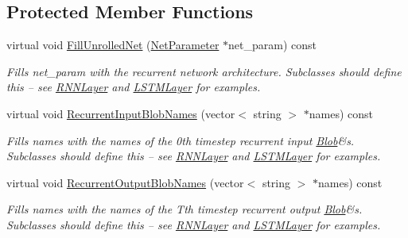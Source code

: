 \subsection*{Protected Member Functions}
\begin{DoxyCompactItemize}
\item 
\mbox{\label{classcaffe_1_1_l_s_t_m_layer_a66285fd55798aa17b8d5d0b7f30f8346}} 
virtual void \mbox{\hyperlink{classcaffe_1_1_l_s_t_m_layer_a66285fd55798aa17b8d5d0b7f30f8346}{Fill\+Unrolled\+Net}} (\mbox{\hyperlink{classcaffe_1_1_net_parameter}{Net\+Parameter}} $\ast$net\+\_\+param) const
\begin{DoxyCompactList}\small\item\em Fills net\+\_\+param with the recurrent network architecture. Subclasses should define this -- see \mbox{\hyperlink{classcaffe_1_1_r_n_n_layer}{R\+N\+N\+Layer}} and \mbox{\hyperlink{classcaffe_1_1_l_s_t_m_layer}{L\+S\+T\+M\+Layer}} for examples. \end{DoxyCompactList}\item 
\mbox{\label{classcaffe_1_1_l_s_t_m_layer_a03c6f191bd5a314981514b9bbd3ce450}} 
virtual void \mbox{\hyperlink{classcaffe_1_1_l_s_t_m_layer_a03c6f191bd5a314981514b9bbd3ce450}{Recurrent\+Input\+Blob\+Names}} (vector$<$ string $>$ $\ast$names) const
\begin{DoxyCompactList}\small\item\em Fills names with the names of the 0th timestep recurrent input \mbox{\hyperlink{classcaffe_1_1_blob}{Blob}}\&s. Subclasses should define this -- see \mbox{\hyperlink{classcaffe_1_1_r_n_n_layer}{R\+N\+N\+Layer}} and \mbox{\hyperlink{classcaffe_1_1_l_s_t_m_layer}{L\+S\+T\+M\+Layer}} for examples. \end{DoxyCompactList}\item 
\mbox{\label{classcaffe_1_1_l_s_t_m_layer_a1ea6a5c2801b1463604bc67c4dbf1df1}} 
virtual void \mbox{\hyperlink{classcaffe_1_1_l_s_t_m_layer_a1ea6a5c2801b1463604bc67c4dbf1df1}{Recurrent\+Output\+Blob\+Names}} (vector$<$ string $>$ $\ast$names) const
\begin{DoxyCompactList}\small\item\em Fills names with the names of the Tth timestep recurrent output \mbox{\hyperlink{classcaffe_1_1_blob}{Blob}}\&s. Subclasses should define this -- see \mbox{\hyperlink{classcaffe_1_1_r_n_n_layer}{R\+N\+N\+Layer}} and \mbox{\hyperlink{classcaffe_1_1_l_s_t_m_layer}{L\+S\+T\+M\+Layer}} for examples. \end{DoxyCompactList}\item 

\end{DoxyCompactItemize}
